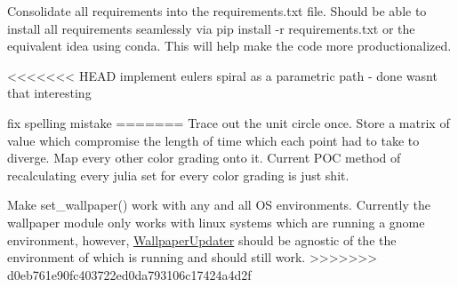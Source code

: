 \begin{DoxyRefList}
Consolidate all requirements into the requirements.\+txt file. Should be able to install all requirements seamlessly via pip install -\/r requirements.\+txt or the equivalent idea using conda. This will help make the code more productionalized. 

<<<<<<< HEAD
implement eulers spiral as a parametric path -\/ done wasn\textquotesingle{}t that interesting  
\item[Member \mbox{\hyperlink{classJulia_1_1Julia_a966f5090e8ab789ab45b8bbe84435da9}{Julia.Julia.color\+\_\+map\+\_\+\+PIL}} (self, itterations\+\_\+til\+\_\+divergence)]\label{todo__todo000003}%
%
fix spelling mistake 
=======
Trace out the unit circle once. Store a matrix of value which compromise the length of time which each point had to take to diverge. Map every other color grading onto it. Current P\+OC method of recalculating every julia set for every color grading is just shit.  
\item[Namespace \mbox{\hyperlink{namespaceWallpaperUpdater}{Wallpaper\+Updater}} ]\label{todo__todo000005}%
%
Make set\+\_\+wallpaper() work with any and all OS environments. Currently the wallpaper module only works with linux systems which are running a gnome environment, however, \mbox{\hyperlink{namespaceWallpaperUpdater}{Wallpaper\+Updater}} should be agnostic of the the environment of which is running and should still work. 
>>>>>>> d0eb761e90fc403722ed0da793106c17424a4d2f
\end{DoxyRefList}